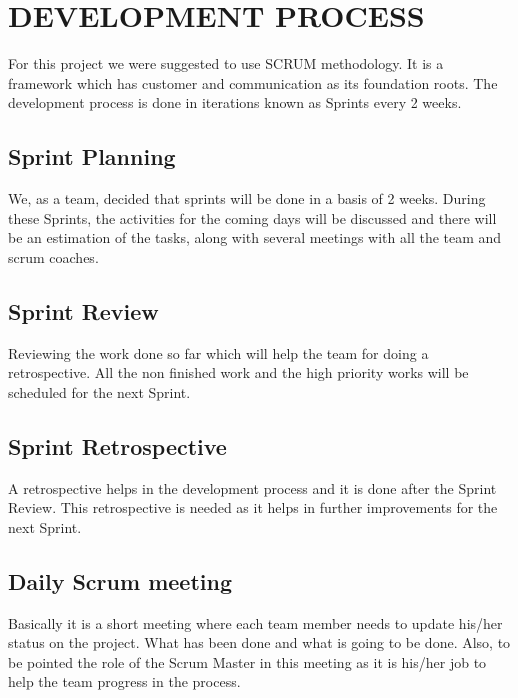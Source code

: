 \section{DEVELOPMENT PROCESS}
For this project we were suggested to use SCRUM methodology. It is a framework which has customer and communication as its foundation roots. The development process is done in iterations known as Sprints every 2 weeks.
\subsection{Sprint Planning}
We, as a team, decided that sprints will be done in a basis of 2 weeks. During these Sprints, the activities for the coming days will be discussed and there will be an estimation of the tasks, along with several meetings with all the team and scrum coaches.  
\subsection{Sprint Review}
Reviewing the work done so far which will help the team for doing a retrospective. All the non finished work and the high priority works will be scheduled for the next Sprint.
\subsection{Sprint Retrospective}
A retrospective helps in the development process and it is done after the Sprint Review.
This retrospective is needed as it helps in further improvements for the next Sprint. 
\subsection{Daily Scrum meeting}
Basically it is a short meeting where each team member needs to update his/her status on the project. What has been done and what is going to be done. Also, to be pointed the role of the Scrum Master in this meeting as it is his/her job to help the team progress in the process. 